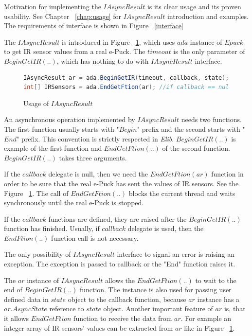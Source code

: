 \documentclass[12pt,notitlepage]{report}
\begin{document}
	Motivation for implementing the $IAsyncResult$ is its clear usage and its proven usability.
	See Chapter ~\ref{chap:usage} for $IAsyncResult$ introduction and examples.
	The requirements of interface is shown in Figure ~\ref{interface}

	The $IAsyncResult$ is introduced in Figure ~\ref{arexample}, which uses $ada$ instance
	of $Epuck$ to get IR sensor values from a real e-Puck. The $timeout$ is the only parameter of $BeginGetIR(..)$,
	which has nothing to do with $IAsyncResult$ interface.

\begin{figure}[!hbp]
\begin{lstlisting}[language=cs]
IAsyncResult ar = ada.BeginGetIR(timeout, callback, state);            
int[] IRSensors = ada.EndGetFtion(ar); //if callback == null
\end{lstlisting}
\caption{Usage of $IAsyncResult$}\label{arexample}
\end{figure}

	An asynchronous operation implemented by $IAsyncResult$ needs two functions. The first function usually starts with 
	"$Begin$" prefix and the second starts with "$End$" prefix. This convention is strictly respected in {\it Elib}.
	$BeginGetIR(..)$ is example of the first function and $EndGetFtion(..)$ of the second function.
	$BeginGetIR(..)$ takes three arguments. 

	If the $callback$ delegate is null, then we need the $EndGetFtion(ar)$ function
	in order to be sure that the real e-Puck has sent the values of IR sensors. 
	See the Figure ~\ref{arexample}.
	The call of $EndGetFtion(..)$ blocks the current thread and waits synchronously until the real
	e-Puck is stopped.

	If the $callback$ functions are defined, they are raised after the $BeginGetIR(..)$ function has finished.
	Usually, if $callback$ delegate is used, then the $EndFtion(..)$ function call is not necessary.

	The only possibility of $IAsyncResult$ interface to signal an error is raising an exception.
	The exception is passed to callback or the "End" function raises it.

	The $ar$ instance of $IAsyncResult$ allows the $EndGetFtion(..)$ to wait to the end of $BeginGetIR(..)$ function.
	The instance is also used for passing user defined data in $state$ object to the callback function,
	because $ar$ instance has a $ar.AsyncState$ reference to $state$ object.
	Another important feature of $ar$ is, that it allows $EndGetFtion$ function to receive the data
	from $ar$. For example an integer array of IR sensors' values can be extracted from $ar$ like in Figure ~\ref{arexample}.
	
\end{document}
